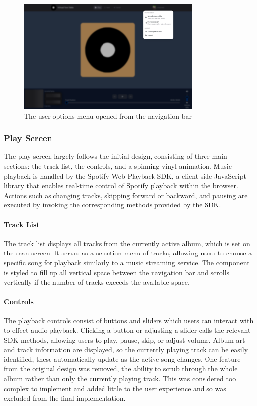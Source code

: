 \begin{figure} [H]
    \centering
    \includegraphics[width=0.8\textwidth]{figures/menu_open_screen.png}
    \caption{The user options menu opened from the navigation bar}
    \label{fig:user_options_menu}
\end{figure}

\subsubsection{Play Screen}
The play screen largely follows the initial design, consisting of three main sections: the track list, the controls, and a spinning vinyl animation. Music playback is handled by the Spotify Web Playback SDK, a client side JavaScript library that enables real-time control of Spotify playback within the browser. Actions such as changing tracks, skipping forward or backward, and pausing are executed by invoking the corresponding methods provided by the SDK.

\paragraph{Track List}
The track list displays all tracks from the currently active album, which is set on the scan screen. It serves as a selection menu of tracks, allowing users to choose a specific song for playback similarly to a music streaming service. The component is styled to fill up all vertical space between the navigation bar and scrolls vertically if the number of tracks exceeds the available space.

\paragraph{Controls}
The playback controls consist of buttons and sliders which users can interact with to effect audio playback. Clicking a button or adjusting a slider calls the relevant SDK methods, allowing users to play, pause, skip, or adjust volume. Album art and track information are displayed, so the currently playing track can be easily identified, these automatically update as the active song changes.
One feature from the original design was removed, the ability to scrub through the whole album rather than only the currently playing track. This was considered too complex to implement and added little to the user experience and so was excluded from the final implementation.


